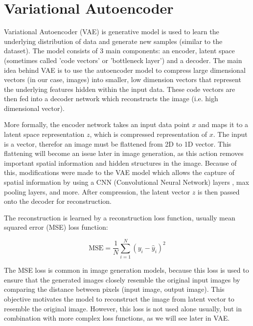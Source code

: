 \section{Variational Autoencoder}
\label{sec:vae}

Variational Autoencoder (VAE) \cite{vae} is generative model is used to learn the underlying distribution of data and generate new samples (similar to the dataset). The model consists of 3 main components: an encoder, latent space (sometimes called 'code vectors' or 'bottleneck layer') and a decoder. The main idea behind VAE is to use the autoencoder model \cite{autoencoder} \cite{autoencoder2} to compress large dimensional vectors (in our case, images) into smaller, low dimension vectors that represent the underlying features hidden within the input data. These code vectors are then fed into a decoder network which reconstructs the image (i.e. high dimensional vector).



More formally, the encoder network takes an input data point $x$ and maps it to a latent space representation $z$, which is compressed representation of $x$. The input is a vector, therefor an image must be flattened from 2D to 1D vector. This flattening will become an issue later in image generation, as this action removes important spatial information and hidden structures in the image. Because of this, modifications were made to the VAE model which allows the capture of spatial information by using a CNN (Convolutional Neural Network) \cite{cnn} layers \cite{vae_cnn_example}, max pooling layers, and more. After compression, the latent vector $z$ is then passed onto the decoder for reconstruction. 

The reconstruction is learned by a reconstruction loss function, usually mean squared error (MSE) loss function:

\begin{equation}
    \text{MSE} = \frac{1}{N} \sum_{i=1}^{N} (y_i - \hat{y}_i)^2
\label{eq:mse}
\end{equation}

The MSE loss is common in image generation models, because this loss is used to ensure that the generated images closely resemble the original input images by comparing the distance between pixels (input image, output image). This objective motivates the model to reconstruct the image from latent vector to resemble the original image. However, this loss is not used alone usually, but in combination with more complex loss functions, as we will see later in VAE.

